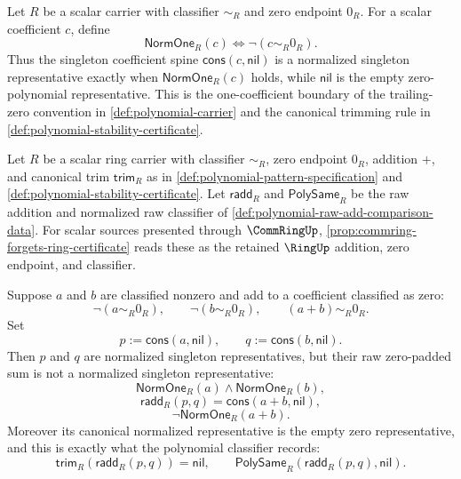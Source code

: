 \begin{definition}
\label{def:polynomial-normalized-singleton-representative}
Let $R$ be a scalar carrier with classifier $\sim_R$ and zero endpoint $0_R$.
For a scalar coefficient $c$, define
$$
\mathsf{NormOne}_R(c)\Longleftrightarrow \neg(c\sim_R0_R).
$$
Thus the singleton coefficient spine $\mathsf{cons}(c,\mathsf{nil})$ is a normalized singleton representative exactly when $\mathsf{NormOne}_R(c)$ holds, while $\mathsf{nil}$ is the empty zero-polynomial representative. This is the one-coefficient boundary of the trailing-zero convention in \autoref{def:polynomial-carrier} and the canonical trimming rule in \autoref{def:polynomial-stability-certificate}.
\end{definition}

\begin{proposition}
\label{prop:raw-polynomial-addition-leaves-singleton-normal-form}
Let $R$ be a scalar ring carrier with classifier $\sim_R$, zero endpoint $0_R$, addition $+$, and canonical trim $\mathsf{trim}_R$ as in \autoref{def:polynomial-pattern-specification} and \autoref{def:polynomial-stability-certificate}. Let $\mathsf{radd}_R$ and $\mathsf{PolySame}_R$ be the raw addition and normalized raw classifier of \autoref{def:polynomial-raw-add-comparison-data}. For scalar sources presented through $\CommRingUp$, \autoref{prop:commring-forgets-ring-certificate} reads these as the retained $\RingUp$ addition, zero endpoint, and classifier.

Suppose $a$ and $b$ are classified nonzero and add to a coefficient classified as zero:
$$
\neg(a\sim_R0_R),\qquad \neg(b\sim_R0_R),\qquad (a+b)\sim_R0_R.
$$
Set
$$
p:=\mathsf{cons}(a,\mathsf{nil}),\qquad q:=\mathsf{cons}(b,\mathsf{nil}).
$$
Then $p$ and $q$ are normalized singleton representatives, but their raw zero-padded sum is not a normalized singleton representative:
$$
\mathsf{NormOne}_R(a)\land \mathsf{NormOne}_R(b),
$$
$$
\mathsf{radd}_R(p,q)=\mathsf{cons}(a+b,\mathsf{nil}),
$$
$$
\neg\mathsf{NormOne}_R(a+b).
$$
Moreover its canonical normalized representative is the empty zero representative, and this is exactly what the polynomial classifier records:
$$
\mathsf{trim}_R(\mathsf{radd}_R(p,q))=\mathsf{nil},
\qquad
\mathsf{PolySame}_R(\mathsf{radd}_R(p,q),\mathsf{nil}).
$$
\end{proposition}
